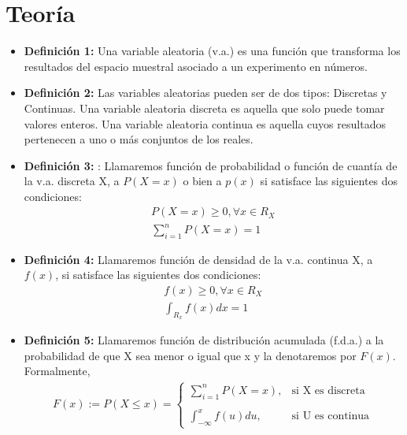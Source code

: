 \documentclass{templateNote}
\begin{document}
\portada
\margenes %

\section{Teoría}
\begin{itemize}
    \item \textbf{Definición 1:} Una variable aleatoria (v.a.) es una función que transforma los resultados del
    espacio muestral asociado a un experimento en números.

    \item \textbf{Definición 2:} Las variables aleatorias pueden ser de dos tipos: Discretas y Continuas. Una
    variable aleatoria discreta es aquella que solo puede tomar valores enteros. Una variable
    aleatoria continua es aquella cuyos resultados pertenecen a uno o más conjuntos de los reales. 

    \item \textbf{Definición 3:} : Llamaremos función de probabilidad o función de cuantía de la v.a. discreta X, a
    $P(X = x)$ o bien a $p(x)$ si satisface las siguientes dos condiciones:
    \begin{align*}
        P(X=x) \geq 0, \forall x \in R_{X} \\
        \displaystyle\sum_{i=1}^{n}{P(X=x) = 1}
    \end{align*}

    \item \textbf{Definición 4:} Llamaremos función de densidad de la v.a. continua X, a $f(x)$, si satisface las
    siguientes dos condiciones:
    \begin{align*}
        f(x) \geq 0, \forall x \in R_{X} \\
        \int_{R_x}{f(x)dx} = 1
    \end{align*}

    \item \textbf{Definición 5:} Llamaremos función de distribución acumulada (f.d.a.) a la probabilidad de que
    X sea menor o igual que x y la denotaremos por $F(x)$. Formalmente,
    \begin{align*}
        F(x) := P(X \leq x) = \begin{cases}
            \displaystyle\sum_{i=1}^{n}{P(X=x)}, 
            & \text{si X es discreta} \\
            \\
            \displaystyle\int_{-\infty}^{x}{f(u)du},
            & \text{si U es continua}
        \end{cases}
    \end{align*}


\end{itemize}
\end{document}
